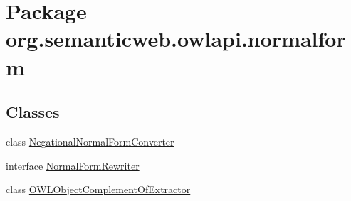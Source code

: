 \hypertarget{namespaceorg_1_1semanticweb_1_1owlapi_1_1normalform}{\section{Package org.\-semanticweb.\-owlapi.\-normalform}
\label{namespaceorg_1_1semanticweb_1_1owlapi_1_1normalform}
}
\subsection*{Classes}
\begin{DoxyCompactItemize}
\item 
class \hyperlink{classorg_1_1semanticweb_1_1owlapi_1_1normalform_1_1_negational_normal_form_converter}{Negational\-Normal\-Form\-Converter}
\item 
interface \hyperlink{interfaceorg_1_1semanticweb_1_1owlapi_1_1normalform_1_1_normal_form_rewriter}{Normal\-Form\-Rewriter}
\item 
class \hyperlink{classorg_1_1semanticweb_1_1owlapi_1_1normalform_1_1_o_w_l_object_complement_of_extractor}{O\-W\-L\-Object\-Complement\-Of\-Extractor}
\end{DoxyCompactItemize}
